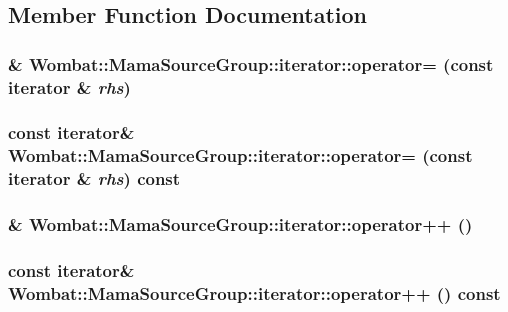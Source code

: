 \subsection{Member Function Documentation}
\hypertarget{classWombat_1_1MamaSourceGroup_1_1iterator_a80c2ba6fb865b4b6275ac03613c258bb}{
\subsubsection[{operator=}]{\& Wombat::MamaSourceGroup::iterator::operator= (const {\bf iterator} \& {\em rhs})}}
\label{classWombat_1_1MamaSourceGroup_1_1iterator_a80c2ba6fb865b4b6275ac03613c258bb}
\hypertarget{classWombat_1_1MamaSourceGroup_1_1iterator_ad5a61e657b2d0d358d8ac882613b8098}{
\subsubsection[{operator=}]{\setlength{\rightskip}{0pt plus 5cm}const {\bf iterator}\& Wombat::MamaSourceGroup::iterator::operator= (const {\bf iterator} \& {\em rhs}) const}}
\label{classWombat_1_1MamaSourceGroup_1_1iterator_ad5a61e657b2d0d358d8ac882613b8098}
\hypertarget{classWombat_1_1MamaSourceGroup_1_1iterator_afa0b25d05f910280f3a5771138dbc506}{
\subsubsection[{operator++}]{\& Wombat::MamaSourceGroup::iterator::operator++ ()}}
\label{classWombat_1_1MamaSourceGroup_1_1iterator_afa0b25d05f910280f3a5771138dbc506}
\hypertarget{classWombat_1_1MamaSourceGroup_1_1iterator_abd217f406cf17c3eee05a5438593a19e}{
\subsubsection[{operator++}]{\setlength{\rightskip}{0pt plus 5cm}const {\bf iterator}\& Wombat::MamaSourceGroup::iterator::operator++ () const}}
